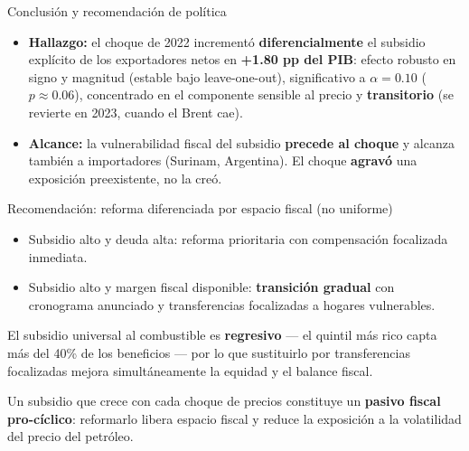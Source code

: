 \documentclass[aspectratio=169,10pt]{beamer}
\newcommand{\key}[1]{{\bfseries\color{AcentoRojo}#1}}
\begin{document}
\begin{frame}{Conclusión y recomendación de política}
  \footnotesize
  \begin{itemize}\setlength{\itemsep}{2pt}
    \item \textbf{Hallazgo:} el choque de 2022 incrementó \textbf{diferencialmente} el subsidio
          explícito de los exportadores netos en \key{+1.80 pp del PIB}: efecto robusto en signo
          y magnitud (estable bajo leave-one-out), significativo a $\alpha = 0.10$
          ($p \approx 0.06$), concentrado en el componente sensible al precio y \textbf{transitorio}
          (se revierte en 2023, cuando el Brent cae).
    \item \textbf{Alcance:} la vulnerabilidad fiscal del subsidio \textbf{precede al choque} y
          alcanza también a importadores (Surinam, Argentina). El choque \textbf{agravó} una
          exposición preexistente, no la creó.
  \end{itemize}

  \begin{block}{Recomendación: reforma diferenciada por espacio fiscal (no uniforme)}
    \begin{itemize}\setlength{\itemsep}{1pt}
      \item Subsidio alto y deuda alta: \alert{reforma prioritaria} con compensación
            focalizada inmediata.
      \item Subsidio alto y margen fiscal disponible: \textbf{transición gradual} con
            cronograma anunciado y transferencias focalizadas a hogares vulnerables.
    \end{itemize}
    \vspace{0.1em}
    {\footnotesize El subsidio universal al combustible es \textbf{regresivo} — el quintil
    más rico capta más del 40\% de los beneficios — por lo que sustituirlo por transferencias
    focalizadas mejora simultáneamente la equidad y el balance fiscal.}
  \end{block}
  \vspace{-0.3em}
  \begin{center}\color{Carbon}\small
  Un subsidio que crece con cada choque de precios constituye un \textbf{pasivo fiscal
  pro-cíclico}: reformarlo libera espacio fiscal y reduce la exposición a la volatilidad
  del precio del petróleo.
  \end{center}

\end{frame}
\end{document}
